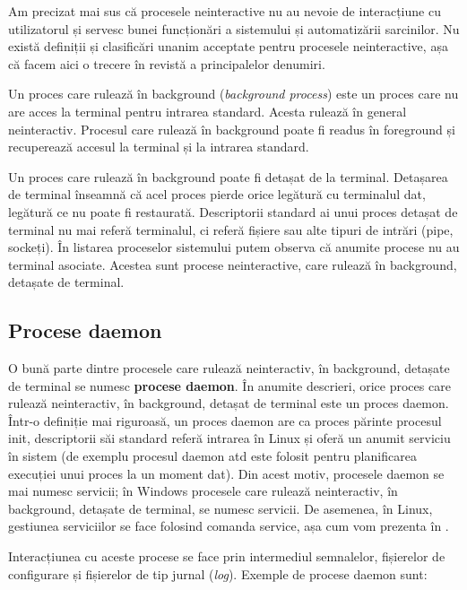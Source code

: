 Am precizat mai sus că procesele neinteractive nu au nevoie de interacțiune cu
utilizatorul și servesc bunei funcționări a sistemului și automatizării
sarcinilor. Nu există definiții și clasificări unanim acceptate pentru procesele
neinteractive, așa că facem aici o trecere în revistă a principalelor denumiri.

Un proces care rulează în background (\textit{background process}) este un proces care nu
are acces la terminal pentru intrarea standard. Acesta rulează în general
neinteractiv. Procesul care rulează în background poate fi readus în foreground
și recuperează accesul la terminal și la intrarea standard.

Un proces care rulează în background poate fi detașat de la terminal. Detașarea
de terminal înseamnă că acel proces pierde orice legătură cu terminalul dat,
legătură ce nu poate fi restaurată. Descriptorii standard ai unui proces detașat
de terminal nu mai referă terminalul, ci referă fișiere sau alte tipuri de
intrări (pipe, sockeți). În listarea proceselor sistemului putem observa că
anumite procese nu au terminal asociate. Acestea sunt procese neinteractive,
care rulează în background, detașate de terminal.

\subsection{Procese daemon}
\label{sec:procese-interactivitate-daemon}

O bună parte dintre procesele care rulează neinteractiv, în background, detașate
de terminal se numesc \textbf{procese daemon}. În anumite descrieri, orice proces care
rulează neinteractiv, în background, detașat de terminal este un proces daemon.
Într-o definiție mai riguroasă, un proces daemon are ca proces părinte procesul
init, descriptorii săi standard referă intrarea  în Linux și oferă un
anumit serviciu în sistem (de exemplu procesul daemon atd este folosit pentru
planificarea execuției unui proces la un moment dat). Din acest motiv, procesele
daemon se mai numesc servicii; în Windows procesele care rulează neinteractiv,
în background, detașate de terminal, se numesc servicii. De asemenea, în Linux,
gestiunea serviciilor se face folosind comanda service, așa cum vom prezenta în
.

Interacțiunea cu aceste procese se face prin intermediul semnalelor, fișierelor
de configurare și fișierelor de tip jurnal (\textit{log}). Exemple de procese daemon
sunt:

